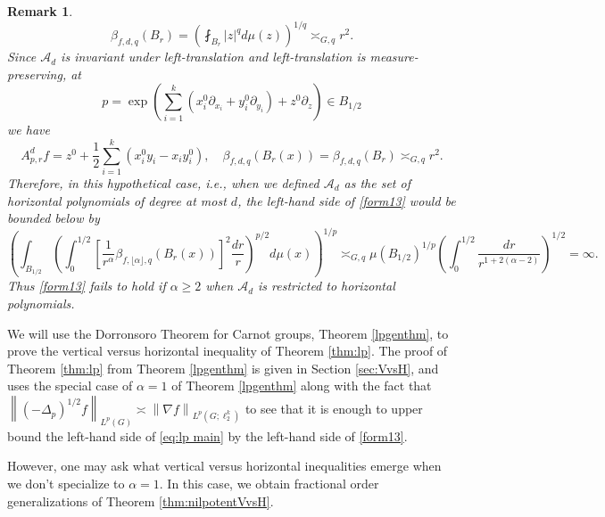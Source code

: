 \documentclass[11pt,reqno]{amsart}
\newtheorem{theorem}{Theorem}
\newtheorem{remark}[theorem]{Remark}
\newcommand{\1}{\mathbf 1}
\begin{document}
\begin{remark}
\[
\beta_{f,d,q}\left(B_r\right)=\left(\fint_{B_r}\left|z\right|^qd\mu\left(z\right)\right)^{1/q}\asymp_{G,q} r^2.
\]
Since $\mathcal{A}_d$ is invariant under left-translation and left-translation is measure-preserving, at
\[
p=\exp\left(\sum_{i=1}^k\left(x^0_i\partial_{x_i}+y^0_i\partial_{y_i}\right)+z^0\partial_z\right)\in B_{1/2}
\]
we have
\[
A^d_{p,r}f=z^0+\frac 12 \sum_{i=1}^k\left(x_i^0y_i-x_iy_i^0\right),\quad \beta_{f,d,q}\left(B_r\left(x\right)\right)=\beta_{f,d,q}\left(B_r\right)\asymp_{G,q}r^2.
\]
Therefore, in this hypothetical case, i.e., when we defined $\mathcal{A}_d$ as the set of horizontal polynomials of degree at most $d$, the left-hand side of \eqref{form13} would be bounded below by
\[
\left(\int_{B_{1/2}} \left(\int_0^{1/2} \left[\frac 1{r^\alpha} \beta_{f,\lfloor \alpha \rfloor,q}\left(B_r\left(x\right)\right) \right]^2 \frac{dr}{r} \right)^{p/2} d\mu\left(x\right) \right)^{1/p}\asymp_{G,q} \mu\left(B_{1/2}\right)^{1/p}\left(\int_0^{1/2}  \frac{dr}{r^{1+2\left(\alpha-2\right)}} \right)^{1/2}=\infty.
\]
Thus \eqref{form13} fails to hold if $\alpha\ge 2$ when $\mathcal{A}_d$ is restricted to horizontal polynomials.
\end{remark}


We will use the Dorronsoro Theorem for Carnot groups, Theorem \ref{lpgenthm}, to prove the vertical versus horizontal inequality of Theorem \ref{thm:lp}. The proof of Theorem \ref{thm:lp} from Theorem \ref{lpgenthm} is given in Section \ref{sec:VvsH}, and uses the special case of $\alpha=1$ of Theorem \ref{lpgenthm} along with the fact that $\left\|\left(-\Delta_p\right)^{1/2}f\right\|_{L^p\left(G\right)}\asymp \left\|\nabla f\right\|_{L^p\left(G;\ell_2^k\right)}$ \cite[(52)]{coulhon2001sobolev} to see that it is enough to upper bound the left-hand side of \eqref{eq:lp main} by the left-hand side of \eqref{form13}.


However, one may ask what vertical versus horizontal inequalities emerge when we don't specialize to $\alpha=1$. In this case, we obtain fractional order generalizations of Theorem \ref{thm:nilpotentVvsH}.



\end{document}
